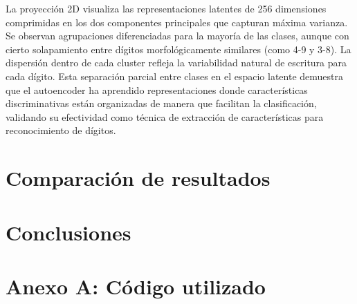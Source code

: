 \documentclass[11pt, a4paper]{article}
\begin{document}
La proyección 2D visualiza las representaciones latentes de 256 dimensiones comprimidas en los dos componentes principales que capturan máxima varianza. Se observan agrupaciones diferenciadas para la mayoría de las clases, aunque con cierto solapamiento entre dígitos morfológicamente similares (como 4-9 y 3-8). La dispersión dentro de cada cluster refleja la variabilidad natural de escritura para cada dígito. Esta separación parcial entre clases en el espacio latente demuestra que el autoencoder ha aprendido representaciones donde características discriminativas están organizadas de manera que facilitan la clasificación, validando su efectividad como técnica de extracción de características para reconocimiento de dígitos.

\section{Comparación de resultados}

\section{Conclusiones}



\clearpage




\section*{Anexo A: Código utilizado}
\end{document}
